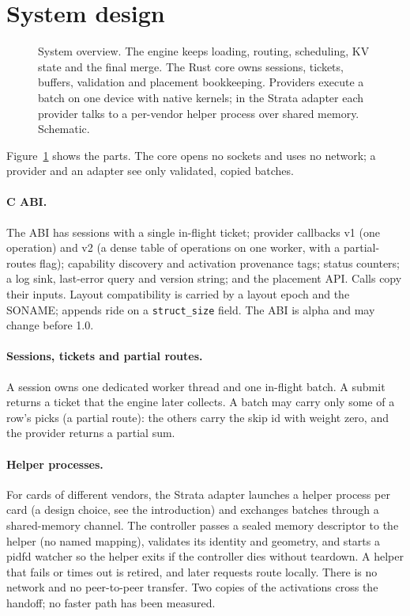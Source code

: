\documentclass[11pt]{article}
\begin{document}
\section{System design}
\begin{figure}[t]
\centering

\caption{System overview. The engine keeps loading, routing, scheduling, KV state and the final merge. The Rust core
owns sessions, tickets, buffers, validation and placement bookkeeping. Providers execute a batch on one device with
native kernels; in the Strata adapter each provider talks to a per-vendor helper process over shared memory.
Schematic.}
\label{fig:system}
\end{figure}

Figure~\ref{fig:system} shows the parts. The core opens no sockets and uses no network; a provider and an adapter see only validated, copied batches.

\paragraph{C ABI.} The ABI has sessions with a single in-flight ticket; provider callbacks v1 (one operation) and v2 (a
dense table of operations on one worker, with a partial-routes flag); capability discovery and activation provenance
tags; status counters; a log sink, last-error query and version string; and the placement API. Calls copy their
inputs. Layout compatibility is carried by a layout epoch and the SONAME; appends ride on a \texttt{struct\_size}
field. The ABI is alpha and may change before 1.0.

\paragraph{Sessions, tickets and partial routes.} A session owns one dedicated worker thread and one in-flight batch.
A submit returns a ticket that the engine later collects. A batch may carry only some of a row's picks (a partial
route): the others carry the skip id with weight zero, and the provider returns a partial sum.

\paragraph{Helper processes.} For cards of different vendors, the Strata adapter launches a helper process
per card (a design choice, see the introduction) and exchanges batches through a shared-memory channel. The controller passes a sealed memory descriptor to the helper
(no named mapping), validates its identity and geometry, and starts a pidfd watcher so the helper exits if the
controller dies without teardown. A helper that fails or times out is retired, and later requests route locally.
There is no network and no peer-to-peer transfer. Two copies of the activations cross the handoff; no faster path has been measured.
\end{document}
